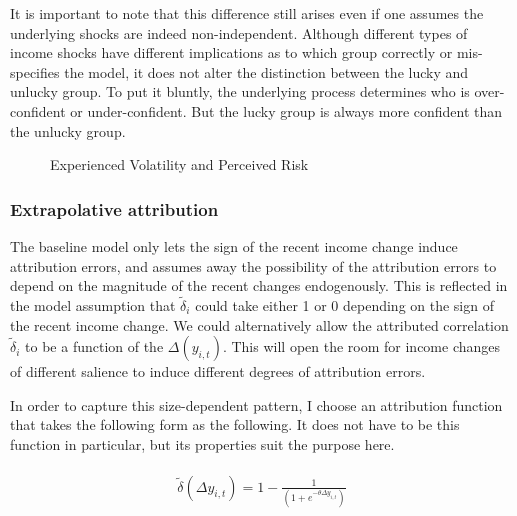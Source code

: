 \documentclass[12pt,notitlepage,onecolumn,aps,pra]{article}
\begin{document}
It is important to note that this difference still arises even if one
assumes the underlying shocks are indeed non-independent. Although
different types of income shocks have different implications as to which
group correctly or mis-specifies the model, it does not alter the
distinction between the lucky and unlucky group. To put it bluntly, the
underlying process determines who is over-confident or under-confident.
But the lucky group is always more confident than the unlucky group.


    \begin{figure*}[!ht]
        \begin{center}\end{center}
        \caption{Experienced Volatility and Perceived Risk}
        \label{fig:var_experience_var}
    \end{figure*}
    
    \hypertarget{extrapolative-attribution}{%
\subsubsection{Extrapolative
attribution}\label{extrapolative-attribution}}

The baseline model only lets the sign of the recent income change induce
attribution errors, and assumes away the possibility of the attribution
errors to depend on the magnitude of the recent changes endogenously.
This is reflected in the model assumption that \(\tilde \delta_i\) could
take either 1 or 0 depending on the sign of the recent income change. We
could alternatively allow the attributed correlation \(\tilde \delta_i\)
to be a function of the \(\Delta(y_{i,t})\). This will open the room for
income changes of different salience to induce different degrees of
attribution errors.

In order to capture this size-dependent pattern, I choose an attribution
function that takes the following form as the following. It does not
have to be this function in particular, but its properties suit the
purpose here.

\begin{eqnarray}
\begin{split}
\tilde \delta(\Delta y_{i,t}) = 1- \frac{1}{(1+e^{-\theta \Delta y_{i,t}})}
\end{split}
\end{eqnarray}
\end{document}
